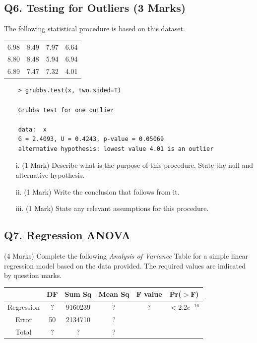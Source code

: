 \documentclass[a4paper,12pt]{article}
\begin{document}
\newpage
\subsection*{Q6. Testing for Outliers (3 Marks)} %
The following statistical procedure is based on this dataset.
\begin{center}
\begin{tabular}{|cccc|}
	\hline
	6.98 &8.49 &7.97& 6.64\\
	8.80 &8.48 &5.94& 6.94\\
	6.89 &7.47 &7.32& 4.01\\
	\hline
\end{tabular}
\end{center}

\begin{framed}

	\begin{verbatim}
	> grubbs.test(x, two.sided=T)
	
	Grubbs test for one outlier
	
	data:  x
	G = 2.4093, U = 0.4243, p-value = 0.05069
	alternative hypothesis: lowest value 4.01 is an outlier
	\end{verbatim}
\end{framed}

\begin{itemize}
	\item[i.] (1 Mark) Describe what is the purpose of this procedure. State the null and alternative hypothesis.
	\item[ii.] (1 Mark) Write the conclusion that follows from it.
	\item[iii.] (1 Mark) State any relevant assumptions for this procedure.
\end{itemize}

\subsection*{Q7. Regression ANOVA}
(4 Marks) Complete the following \textit{Analysis of Variance} Table for a simple linear regression model based on the data provided. The required values are indicated by question marks.
\begin{center}
	\begin{tabular}{|c|c|c|c|c|c|} \hline
		& DF & 	Sum Sq &	Mean Sq &	F value &   	Pr($>$F)    \\ \hline
		Regression &  ? &	9160239 &	? &	 ? &	$< 2.2e^{-16}$ \\ \hline
		Error  & 50 &	2134710 &  	?   &            &       \\ \hline
		Total  & ?  &	? &  	?  &            &       \\ \hline
	\end{tabular} 
\end{center}
\end{document}
